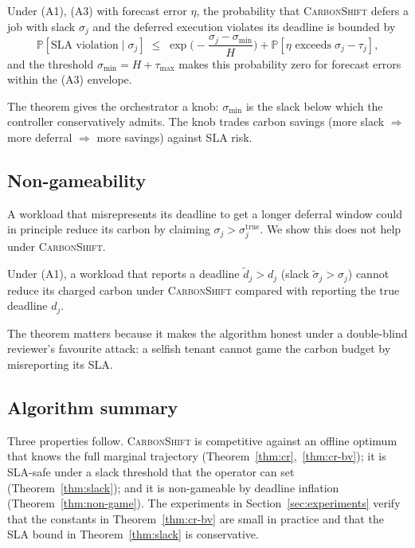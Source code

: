 \begin{theorem}
\label{thm:slack}
Under (A1), (A3) with forecast error $\eta$, the probability that \textsc{CarbonShift} defers a job with slack $\sigma_j$ and the deferred execution violates its deadline is bounded by
\[
\mathbb{P}[\text{SLA violation}\mid\sigma_j] \;\le\; \exp\!\Big(-\frac{\sigma_j-\sigma_{\min}}{H}\Big) + \mathbb{P}[\eta\text{ exceeds}\;\sigma_j-\tau_j],
\]
and the threshold $\sigma_{\min} = H+\tau_{\max}$ makes this probability zero for forecast errors within the (A3) envelope.
\end{theorem}

The theorem gives the orchestrator a knob: $\sigma_{\min}$ is the slack below which the controller conservatively admits. The knob trades carbon savings (more slack $\Rightarrow$ more deferral $\Rightarrow$ more savings) against SLA risk.

\subsection{Non-gameability}
A workload that misrepresents its deadline to get a longer deferral window could in principle reduce its carbon by claiming $\sigma_j>\sigma_j^{\text{true}}$. We show this does not help under \textsc{CarbonShift}.

\begin{theorem}
\label{thm:non-game}
Under (A1), a workload that reports a deadline $\tilde d_j > d_j$ (slack $\tilde\sigma_j>\sigma_j$) cannot reduce its charged carbon under \textsc{CarbonShift} compared with reporting the true deadline $d_j$.
\end{theorem}

The theorem matters because it makes the algorithm honest under a double-blind reviewer's favourite attack: a selfish tenant cannot game the carbon budget by misreporting its SLA.

\subsection{Algorithm summary}
Three properties follow. \textsc{CarbonShift} is competitive against an offline optimum that knows the full marginal trajectory (Theorem~\ref{thm:cr},~\ref{thm:cr-bv}); it is SLA-safe under a slack threshold that the operator can set (Theorem~\ref{thm:slack}); and it is non-gameable by deadline inflation (Theorem~\ref{thm:non-game}). The experiments in Section~\ref{sec:experiments} verify that the constants in Theorem~\ref{thm:cr-bv} are small in practice and that the SLA bound in Theorem~\ref{thm:slack} is conservative.
